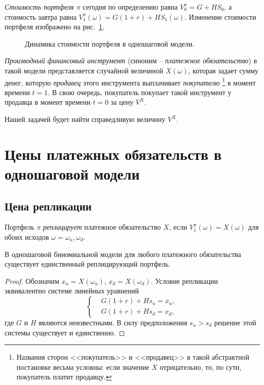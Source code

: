 \emph{Стоимость портфеля $\pi$} сегодня по определению равна $V_0^\pi = G + HS_0$, а стоимость завтра равна $V_1^\pi(\omega) = G(1+r) + H S_1(\omega)$.
Изменение стоимости портфеля изображено на рис.~\ref{os:f:portfolio}.

\begin{figure}[h]
\centering
\caption{Динамика стоимости портфеля в одношаговой модели.}
\label{os:f:portfolio}  
\end{figure}

\emph{Производный финансовый инструмент} (синоним -- \emph{платежное обязательство}) в такой модели представляется случайной величиной $X(\omega)$, которая задает сумму денег, которую \emph{продавец} этого инструмента выплачивает \emph{покупателю}%
\footnote{Названия сторон <<покупатель>> и <<продавец>> в такой абстрактной постановке весьма условны: если значение $X$ отрицательно, то, по сути, покупатель платит продавцу.}
в момент времени $t=1$. В свою очередь, покупатель покупает такой инструмент у продавца в момент времени $t=0$ за цену $V^X$.

Нашей задачей будет найти справедливую величину $V^X$.


\section{Цены платежных обязательств в одношаговой модели}

\subsection{Цена репликации}

\begin{definition}
Портфель $\pi$ \emph{реплицирует} платежное обязательство $X$, если $V_1^\pi(\omega) = X(\omega)$ для обоих исходов $\omega=\omega_u,\omega_d$. 
\end{definition}

\begin{proposition}
В одношаговой биномиальной модели для любого платежного обязательства существует единственный реплицирующий портфель.
\end{proposition}

\begin{proof}
Обозначим $x_u=X(\omega_u)$, $x_d=X(\omega_d)$.
Условие репликации эквивалентно системе линейных уравнений
\begin{equation}
\label{os:replication}
\left\{
\begin{aligned}
&G(1+r) + Hs_u = x_u,\\
&G(1+r) + Hs_d = x_d,
\end{aligned}\right.
\end{equation}
где $G$ и $H$ являются неизвестными.
В силу предположения $s_u>s_d$ решение этой системы существует и единственно.
\end{proof}

